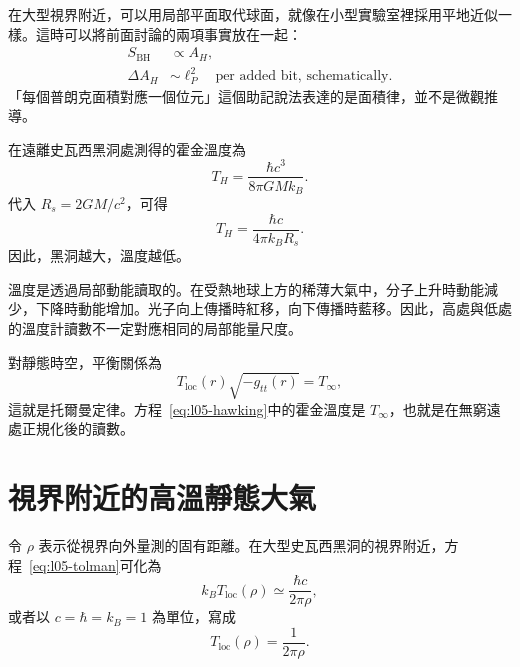 在大型視界附近，可以用局部平面取代球面，就像在小型實驗室裡採用平地近似一樣。這時可以將前面討論的兩項事實放在一起：
\begin{equation}
\begin{aligned}
S_{\mathrm{BH}}&\propto A_H,\\
\Delta A_H&\sim \ell_P^2
\quad\text{per added bit, schematically}.
\end{aligned}
\end{equation}
「每個普朗克面積對應一個位元」這個助記說法表達的是面積律，並不是微觀推導。

在遠離史瓦西黑洞處測得的霍金溫度為
\begin{equation}
T_H=\frac{\hbar c^3}{8\pi GMk_B}.
\label{eq:l05-hawking}
\end{equation}
代入 \(R_s=2GM/c^2\)，可得
\begin{equation}
T_H=\frac{\hbar c}{4\pi k_B R_s}.
\label{eq:l05-hawking-radius}
\end{equation}
因此，黑洞越大，溫度越低。

\begin{classroomqa}
\end{classroomqa}

溫度是透過局部動能讀取的。在受熱地球上方的稀薄大氣中，分子上升時動能減少，下降時動能增加。光子向上傳播時紅移，向下傳播時藍移。因此，高處與低處的溫度計讀數不一定對應相同的局部能量尺度。

對靜態時空，平衡關係為
\begin{equation}
T_{\mathrm{loc}}(r)\sqrt{-g_{tt}(r)}=T_\infty,
\label{eq:l05-tolman}
\end{equation}
這就是托爾曼定律。方程~\eqref{eq:l05-hawking}中的霍金溫度是 \(T_\infty\)，也就是在無窮遠處正規化後的讀數。

\section{視界附近的高溫靜態大氣}

令 \(\rho\) 表示從視界向外量測的固有距離。在大型史瓦西黑洞的視界附近，方程~\eqref{eq:l05-tolman}可化為
\begin{equation}
k_B T_{\mathrm{loc}}(\rho)
\simeq\frac{\hbar c}{2\pi\rho},
\label{eq:l05-local-temperature-si}
\end{equation}
或者以 \(c=\hbar=k_B=1\) 為單位，寫成
\begin{equation}
T_{\mathrm{loc}}(\rho)=\frac{1}{2\pi\rho}.
\label{eq:l05-local-temperature}
\end{equation}

